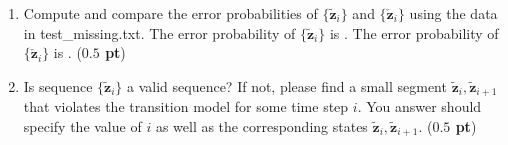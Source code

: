\documentclass[twoside]{article}
\begin{document}
\begin{enumerate}
\begin{enumerate}
\end{enumerate}

\item Compute and compare the error probabilities of $\{\tilde{\mathbf{z}}_i\}$ and $\{\check{\mathbf{z}}_i\}$ using the data in \textsf{test\_missing.txt}.  The error probability of $\{\tilde{\mathbf{z}}_i\}$ is . The error probability of $\{\check{\mathbf{z}}_i\}$ is . ({\bf $0.5$ pt})

\item Is sequence $\{\tilde{\mathbf{z}}_i\}$ a valid sequence? If not, please find a small segment $\tilde{\mathbf{z}}_i,\tilde{\mathbf{z}}_{i+1}$ that violates the transition model for some time step $i$. You answer should specify the value of $i$ as well as the corresponding states $\tilde{\mathbf{z}}_i,\tilde{\mathbf{z}}_{i+1}$. ({\bf $0.5$ pt})
     \begin{center}
   \end{center}
\end{enumerate}
\end{document}
